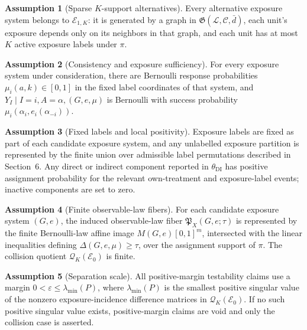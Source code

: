 \documentclass[11pt]{article}
\theoremstyle{definition}
\newtheorem{assumption}{Assumption}
\theoremstyle{plain}
\theoremstyle{remark}
\begin{document}
\begin{assumption}[Sparse \(K\)-support alternatives]\label{ass:sparse-k}
Every alternative exposure system belongs to \(\mathcal E_{1,K}\): it is generated by a graph in \(\mathfrak G(\mathcal L,\mathcal C,\bar d)\), each unit's exposure depends only on its neighbors in that graph, and each unit has at most \(K\) active exposure labels under \(\pi\).
\end{assumption}

\begin{assumption}[Consistency and exposure sufficiency]\label{ass:consistency}
For every exposure system under consideration, there are Bernoulli response probabilities \(\mu_i(a,k)\in[0,1]\) in the fixed label coordinates of that system, and \(Y_I\mid I=i,A=\alpha,(G,e,\mu)\) is Bernoulli with success probability \(\mu_i(\alpha_i,e_i(\alpha_{-i}))\).
\end{assumption}

\begin{assumption}[Fixed labels and local positivity]\label{ass:labels}
Exposure labels are fixed as part of each candidate exposure system, and any unlabelled exposure partition is represented by the finite union over admissible label permutations described in Section~6.  Any direct or indirect component reported in \(\theta_{\mathrm{DI}}\) has positive assignment probability for the relevant own-treatment and exposure-label events; inactive components are set to zero.
\end{assumption}

\begin{assumption}[Finite observable-law fibers]\label{ass:fibers}
For each candidate exposure system \((G,e)\), the induced observable-law fiber \(\mathfrak P_X(G,e;\tau)\) is represented by the finite Bernoulli-law affine image \(M(G,e)[0,1]^m\), intersected with the linear inequalities defining \(\Delta(G,e,\mu)\ge\tau\), over the assignment support of \(\pi\).  The collision quotient \(\mathcal Q_K(\mathcal E_0)\) is finite.
\end{assumption}

\begin{assumption}[Separation scale]\label{ass:scale}
All positive-margin testability claims use a margin \(0<\varepsilon\le\lambda_{\min}(P)\), where \(\lambda_{\min}(P)\) is the smallest positive singular value of the nonzero exposure-incidence difference matrices in \(\mathcal Q_K(\mathcal E_0)\).  If no such positive singular value exists, positive-margin claims are void and only the collision case is asserted.
\end{assumption}
\end{document}
